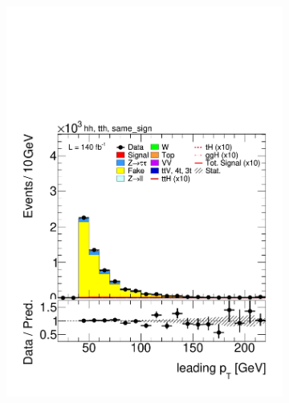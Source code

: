   
  \begin{figure}[htbp]
    \centering
    \begin{subfigure}[b]{0.45\textwidth}
      \centering
      \includegraphics[width=\textwidth]{images/same_sign_same_sign_run2/plot_tau_0_pt_hh_tth_15_16_17_18_same_sign.pdf}
      \caption{}
    \end{subfigure}
    \hfill
    \begin{subfigure}[b]{0.45\textwidth}
      \centering

\end{subfigure}
\end{figure}
